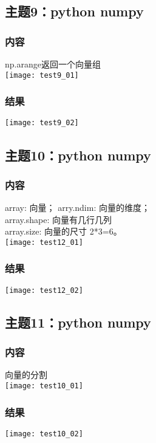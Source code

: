 \documentclass{article}
\begin{document}
\subsection{主题9：python numpy}  
\subsubsection{内容}
np.arange返回一个向量组\\
\texttt{[image: test9\_01]}\\
\subsubsection{结果}  
\texttt{[image: test9\_02]}\\
\vspace{1cm}
\subsection{主题10：python numpy}  
\subsubsection{内容}
array: 向量；
arry.ndim: 向量的维度；\\
array.shape: 向量有几行几列\\
array.size: 向量的尺寸 2*3=6。\\
\texttt{[image: test12\_01]}\\
\subsubsection{结果}  
\texttt{[image: test12\_02]}\\
\subsection{主题11：python numpy}  
\subsubsection{内容}
向量的分割\\
\texttt{[image: test10\_01]}\\
\subsubsection{结果}  
\texttt{[image: test10\_02]}\\
\vspace{1cm}
\end{document}
